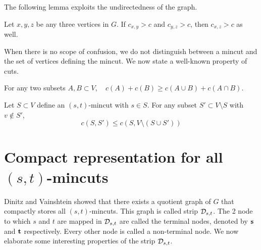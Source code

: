 The following lemma exploits the undirectedness of the graph.
\begin{lemma}
Let $x,y,z$ be any three vertices in $G$. If $c_{x,y}>c$ and $c_{y,z}>c$, then $c_{x,z}>c$ as well. 
\label{lem:triangle-inequality}
\end{lemma}

When there is no scope of confusion, we do not distinguish between a mincut and the set of vertices defining the mincut. 
We now state a well-known property of cuts.
\begin{lemma}
For any two subsets $A,B\subset V$, ~
$ c(A) +c(B) \ge c(A\cup B) + c(A\cap B)$.
\label{lem:submodularity}
\end{lemma}


\begin{lemma}
Let $S \subset V$ define an $(s,t)$-mincut with $s\in S$. For any subset $S'\subset V\setminus S$ with $v\notin S'$,
\[ 
c(S,S') \le c(S,V\setminus (S\cup S'))
\]
\label{lem:subset-property-of-min-cut}
\end{lemma}


\section{Compact representation for all $(s,t)$-mincuts}
Dinitz and Vainshtein \cite{DBLP:journals/siamcomp/DinitzV00} showed that there exists a quotient graph of $G$ that compactly stores all $(s,t)$-mincuts. This graph is called strip ${\cal D}_{s,t}$. The 2 node to which $s$ and $t$ are mapped in ${\cal D}_{s,t}$ are called the terminal nodes, denoted by ${\bf s}$ and ${\bf t}$ respectively. Every other node is called a non-terminal node. We now elaborate some interesting properties of the strip ${\cal D}_{s,t}$.

